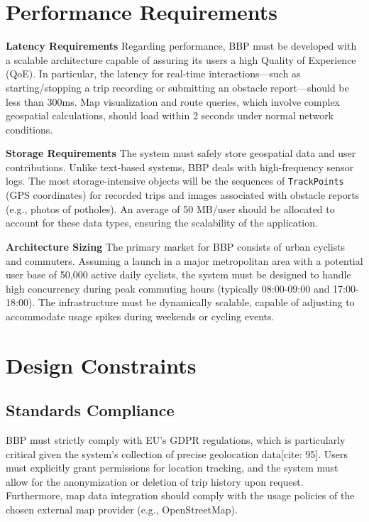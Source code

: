 \section{Performance Requirements}
\label{sec:performance-requirements}

\par{\textbf{Latency Requirements}} Regarding performance, BBP must be developed with a scalable architecture capable of assuring its users a high Quality of Experience (QoE). In particular, the latency for real-time interactions—such as starting/stopping a trip recording or submitting an obstacle report—should be less than 300ms. Map visualization and route queries, which involve complex geospatial calculations, should load within 2 seconds under normal network conditions.

\par{\textbf{Storage Requirements}} The system must safely store geospatial data and user contributions. Unlike text-based systems, BBP deals with high-frequency sensor logs. The most storage-intensive objects will be the sequences of \texttt{TrackPoints} (GPS coordinates) for recorded trips and images associated with obstacle reports (e.g., photos of potholes). An average of 50 MB/user should be allocated to account for these data types, ensuring the scalability of the application.

\par{\textbf{Architecture Sizing}} The primary market for BBP consists of urban cyclists and commuters. Assuming a launch in a major metropolitan area with a potential user base of 50,000 active daily cyclists, the system must be designed to handle high concurrency during peak commuting hours (typically 08:00-09:00 and 17:00-18:00). The infrastructure must be dynamically scalable, capable of adjusting to accommodate usage spikes during weekends or cycling events.

\section{Design Constraints}
\label{sec:design-constraints}

\subsection{Standards Compliance}
\label{subsec:standards-compliance}

\par BBP must strictly comply with EU’s GDPR regulations, which is particularly critical given the system's collection of precise geolocation data[cite: 95]. Users must explicitly grant permissions for location tracking, and the system must allow for the anonymization or deletion of trip history upon request. Furthermore, map data integration should comply with the usage policies of the chosen external map provider (e.g., OpenStreetMap).


